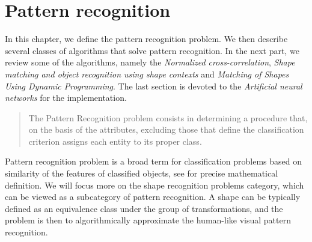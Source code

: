 \chapter{Pattern recognition}
In this chapter, we define the pattern recognition problem. We then describe several classes of algorithms that solve pattern recognition. In the next part, we review some of the algorithms, namely the \emph{Normalized cross-correlation}, \emph{Shape matching and object recognition using shape contexts} and \emph{Matching of Shapes Using Dynamic Programming}. The last section is devoted to the \emph{Artificial neural networks}   for the implementation.

 \citet{formalMethods}  \begin{quotation}
The Pattern Recognition problem consists in determining a procedure that, on the basis of the attributes, excluding those that define the classification criterion assigns each entity to its proper class.
\end{quotation}

Pattern recognition problem is a broad term for classification problems  based on similarity of the features of classified objects, see \citet{formalMethods}  for precise mathematical definition. We will focus more on the shape recognition problems category, which can be viewed as a subcategory of pattern recognition. A shape can be typically defined as an equivalence class under the group of transformations, and the problem is then to algorithmically approximate the human-like visual pattern recognition. 

